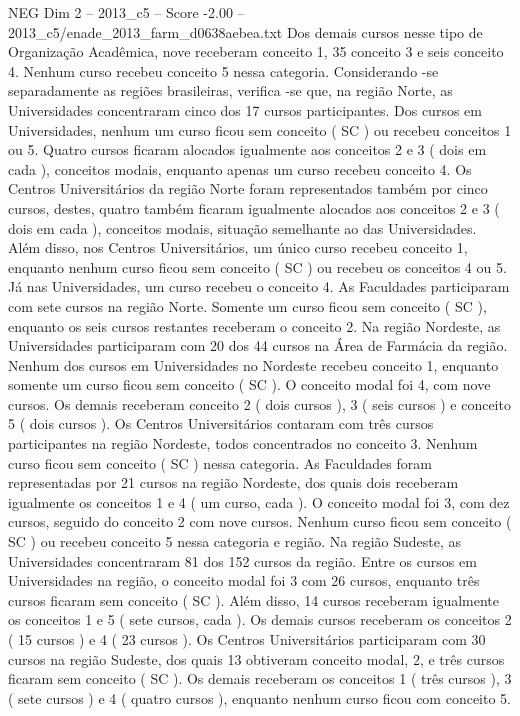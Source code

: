 \begin{textsample}{NEG Dim 2 – 2013\_c5 – Score -2.00 – 2013\_c5/enade\_2013\_farm\_d0638aebea.txt}
Dos demais cursos nesse tipo de Organização Acadêmica, nove receberam conceito 1, 35 conceito 3 e seis conceito 4.
Nenhum curso recebeu conceito 5 nessa categoria.
Considerando -se separadamente as regiões brasileiras, verifica -se que, na região Norte, as Universidades concentraram cinco dos 17 cursos participantes.
Dos cursos em Universidades, nenhum um curso ficou sem conceito ( SC ) ou recebeu conceitos 1 ou 5.
Quatro cursos ficaram alocados igualmente aos conceitos 2 e 3 ( dois em cada ), conceitos modais, enquanto apenas um curso recebeu conceito 4.
Os Centros Universitários da região Norte foram representados também por cinco cursos, destes, quatro também ficaram igualmente alocados aos conceitos 2 e 3 ( dois em cada ), conceitos modais, situação semelhante ao das Universidades.
Além disso, nos Centros Universitários, um único curso recebeu conceito 1, enquanto nenhum curso ficou sem conceito ( SC ) ou recebeu os conceitos 4 ou 5.
Já nas Universidades, um curso recebeu o conceito 4.
As Faculdades participaram com sete cursos na região Norte.
Somente um curso ficou sem conceito ( SC ), enquanto os seis cursos restantes receberam o conceito 2.
Na região Nordeste, as Universidades participaram com 20 dos 44 cursos na Área de Farmácia da região.
Nenhum dos cursos em Universidades no Nordeste recebeu conceito 1, enquanto somente um curso ficou sem conceito ( SC ).
O conceito modal foi 4, com nove cursos.
Os demais receberam conceito 2 ( dois cursos ), 3 ( seis cursos ) e conceito 5 ( dois cursos ).
Os Centros Universitários contaram com três cursos participantes na região Nordeste, todos concentrados no conceito 3.
Nenhum curso ficou sem conceito ( SC ) nessa categoria.
As Faculdades foram representadas por 21 cursos na região Nordeste, dos quais dois receberam igualmente os conceitos 1 e 4 ( um curso, cada ).
O conceito modal foi 3, com dez cursos, seguido do conceito 2 com nove cursos.
Nenhum curso ficou sem conceito ( SC ) ou recebeu conceito 5 nessa categoria e região.
Na região Sudeste, as Universidades concentraram 81 dos 152 cursos da região.
Entre os cursos em Universidades na região, o conceito modal foi 3 com 26 cursos, enquanto três cursos ficaram sem conceito ( SC ).
Além disso, 14 cursos receberam igualmente os conceitos 1 e 5 ( sete cursos, cada ).
Os demais cursos receberam os conceitos 2 ( 15 cursos ) e 4 ( 23 cursos ).
Os Centros Universitários participaram com 30 cursos na região Sudeste, dos quais 13 obtiveram conceito modal, 2, e três cursos ficaram sem conceito ( SC ).
Os demais receberam os conceitos 1 ( três cursos ), 3 ( sete cursos ) e 4 ( quatro cursos ), enquanto nenhum curso ficou com conceito 5.

\end{textsample}
